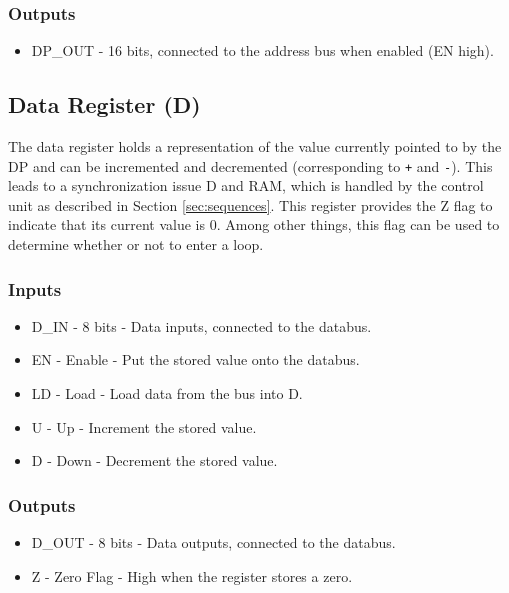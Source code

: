 \subsubsection*{Outputs}
\begin{itemize}
\itemsep0em   
\item DP\_OUT - 16 bits, connected to the address bus when enabled (EN high).
\end{itemize}

\subsection{Data Register (D)} \label{sec:architecture:d}
The data register holds a representation of the value currently pointed to by the DP and can be incremented and decremented (corresponding to \texttt{+} and \texttt{-}). This leads to a synchronization issue D and RAM, which is handled by the control unit as described in Section \ref{sec:sequences}. This register provides the Z flag to indicate that its current value is 0. Among other things, this flag can be used to determine whether or not to enter a loop.

\subsubsection*{Inputs}
\begin{itemize}
\itemsep0em   
\item D\_IN - 8 bits - Data inputs, connected to the databus.
\item EN - Enable - Put the stored value onto the databus.
\item LD - Load - Load data from the bus into D.
\item U - Up - Increment the stored value.
\item D - Down - Decrement the stored value.
\end{itemize}

\subsubsection*{Outputs}
\begin{itemize}
\itemsep0em 
\item D\_OUT - 8 bits - Data outputs, connected to the databus.
\item Z - Zero Flag - High when the register stores a zero.
\end{itemize}


